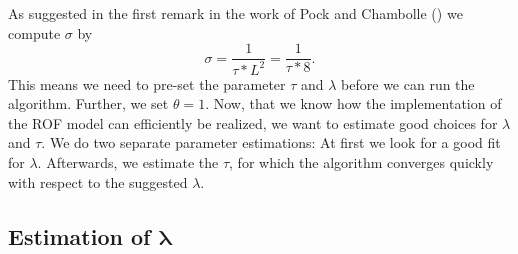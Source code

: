 \documentclass[abstracton]{scrreprt}
\begin{document}
                As suggested in the first remark in the work of Pock and Chambolle (\cite{Chambolle10afirst-order}) we compute $\sigma$ by
                    $$
                        \sigma = \frac{1}{\tau * L^{2}} = \frac{1}{\tau * 8}.
                    $$
                This means we need to pre-set the parameter $\tau$ and $\lambda$ before we can run the algorithm. Further, we set $\theta = 1$. Now, that we know how the implementation of the ROF model can efficiently be realized, we want to estimate good choices for $\lambda$ and $\tau$. We do two separate parameter estimations: At first we look for a good fit for $\lambda$. Afterwards, we estimate the $\tau$, for which the algorithm converges quickly with respect to the suggested $\lambda$.

        \subsection{Estimation of $\boldsymbol{\lambda}$}
        \label{sub:estimation_of_lambda_rof}
\end{document}
